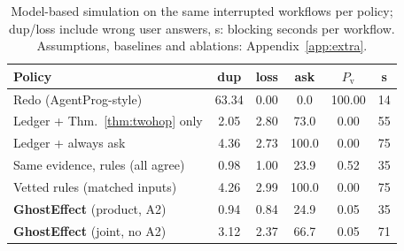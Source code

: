 \begin{table}[t]
\centering
\caption{Model-based simulation on the same \SimN{} interrupted workflows per policy; dup/loss include wrong user answers, s: blocking seconds per workflow. Assumptions, baselines and ablations: Appendix~\ref{app:extra}.}
\label{tab:planner}
\footnotesize
\setlength{\tabcolsep}{2.2pt}
\begin{tabular}{@{}l ccccc@{}}
\toprule
Policy & dup & loss & ask & $P_{\mathrm{v}}$ & s \\
\midrule
Redo (AgentProg-style) & 63.34 & 0.00 & 0.0 & 100.00 & 14 \\
Ledger + Thm.~\ref{thm:twohop} only & 2.05 & 2.80 & 73.0 & 0.00 & 55 \\
Ledger + always ask & 4.36 & 2.73 & 100.0 & 0.00 & 75 \\
Same evidence, rules (all agree) & 0.98 & 1.00 & 23.9 & 0.52 & 35 \\
Vetted rules (matched inputs) & 4.26 & 2.99 & 100.0 & 0.00 & 75 \\
\textbf{GhostEffect} (product, A2) & 0.94 & 0.84 & 24.9 & 0.05 & 35 \\
\textbf{GhostEffect} (joint, no A2) & 3.12 & 2.37 & 66.7 & 0.05 & 71 \\
\bottomrule
\end{tabular}
\end{table}
